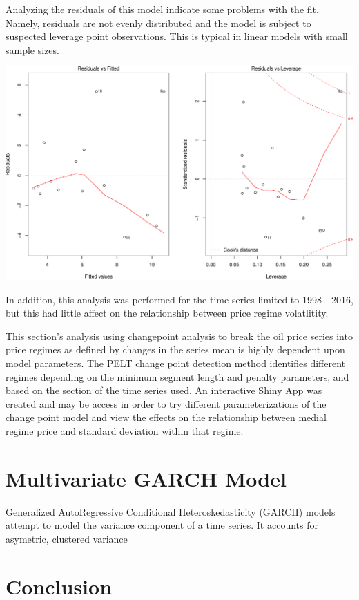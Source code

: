 \documentclass[]{article}
\begin{document}
Analyzing the residuals of this model indicate some problems with the
fit. Namely, residuals are not evenly distributed and the model is
subject to suspected leverage point observations. This is typical in
linear models with small sample sizes.

\includegraphics{Figs/unnamed-chunk-17-1.pdf}

In addition, this analysis was performed for the time series limited to
1998 - 2016, but this had little affect on the relationship between
price regime volatlitity.

This section's analysis using changepoint analysis to break the oil
price series into price regimes as defined by changes in the series mean
is highly dependent upon model parameters. The PELT change point
detection method identifies different regimes depending on the minimum
segment length and penalty parameters, and based on the section of the
time series used. An interactive Shiny App was created and may be access
in order to try different parameterizations of the change point model
and view the effects on the relationship between medial regime price and
standard deviation within that regime.

\section{Multivariate GARCH Model}\label{multivariate-garch-model}

Generalized AutoRegressive Conditional Heteroskedasticity (GARCH) models
attempt to model the variance component of a time series. It accounts
for asymetric, clustered variance

\section{Conclusion}\label{conclusion}
\end{document}
